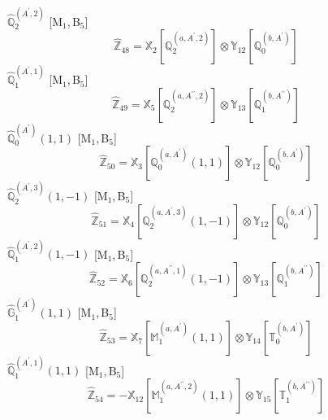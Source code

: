 \documentclass[fleqn,10pt,landscape]{article}
\begin{document}
\begin{itemize}
\noindent {} $\,\,\,\hat{\mathbb{Q}}_{2}^{(A^{\prime},2)}$ [M$_{1}$,\,B$_{5}$]
\begin{dmath*}
\hat{\mathbb{Z}}_{48}=\mathbb{X}_{2}[\mathbb{Q}_{2}^{(a,A^{\prime},2)}] \otimes\mathbb{Y}_{12}[\mathbb{Q}_{0}^{(b,A^{\prime})}]
\end{dmath*}
\vspace{4mm}
\noindent {} $\,\,\,\hat{\mathbb{Q}}_{1}^{(A^{\prime},1)}$ [M$_{1}$,\,B$_{5}$]
\begin{dmath*}
\hat{\mathbb{Z}}_{49}=\mathbb{X}_{5}[\mathbb{Q}_{2}^{(a,A^{\prime\prime},2)}] \otimes\mathbb{Y}_{13}[\mathbb{Q}_{1}^{(b,A^{\prime\prime})}]
\end{dmath*}
\vspace{4mm}
\noindent {} $\,\,\,\hat{\mathbb{Q}}_{0}^{(A^{\prime})}(1,1)$ [M$_{1}$,\,B$_{5}$]
\begin{dmath*}
\hat{\mathbb{Z}}_{50}=\mathbb{X}_{3}[\mathbb{Q}_{0}^{(a,A^{\prime})}(1,1)] \otimes\mathbb{Y}_{12}[\mathbb{Q}_{0}^{(b,A^{\prime})}]
\end{dmath*}
\vspace{4mm}
\noindent {} $\,\,\,\hat{\mathbb{Q}}_{2}^{(A^{\prime},3)}(1,-1)$ [M$_{1}$,\,B$_{5}$]
\begin{dmath*}
\hat{\mathbb{Z}}_{51}=\mathbb{X}_{4}[\mathbb{Q}_{2}^{(a,A^{\prime},3)}(1,-1)] \otimes\mathbb{Y}_{12}[\mathbb{Q}_{0}^{(b,A^{\prime})}]
\end{dmath*}
\vspace{4mm}
\noindent {} $\,\,\,\hat{\mathbb{Q}}_{1}^{(A^{\prime},2)}(1,-1)$ [M$_{1}$,\,B$_{5}$]
\begin{dmath*}
\hat{\mathbb{Z}}_{52}=\mathbb{X}_{6}[\mathbb{Q}_{2}^{(a,A^{\prime\prime},1)}(1,-1)] \otimes\mathbb{Y}_{13}[\mathbb{Q}_{1}^{(b,A^{\prime\prime})}]
\end{dmath*}
\vspace{4mm}
\noindent {} $\,\,\,\hat{\mathbb{G}}_{1}^{(A^{\prime})}(1,1)$ [M$_{1}$,\,B$_{5}$]
\begin{dmath*}
\hat{\mathbb{Z}}_{53}=\mathbb{X}_{7}[\mathbb{M}_{1}^{(a,A^{\prime})}(1,1)] \otimes\mathbb{Y}_{14}[\mathbb{T}_{0}^{(b,A^{\prime})}]
\end{dmath*}
\vspace{4mm}
\noindent {} $\,\,\,\hat{\mathbb{Q}}_{1}^{(A^{\prime},1)}(1,1)$ [M$_{1}$,\,B$_{5}$]
\begin{dmath*}
\hat{\mathbb{Z}}_{54}=- \mathbb{X}_{12}[\mathbb{M}_{1}^{(a,A^{\prime\prime},2)}(1,1)] \otimes\mathbb{Y}_{15}[\mathbb{T}_{1}^{(b,A^{\prime\prime})}]

\end{dmath*}
\end{itemize}
\end{document}

